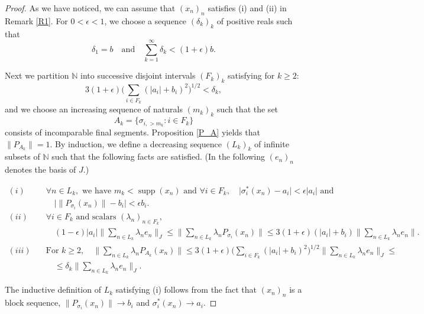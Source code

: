 \documentclass[10pt,a4paper]{amsart}
\DeclareMathOperator{\supp}{supp}
\newcommand{\N}{\mathbb{N}}
\newcommand{\s}{\sigma}
\begin{document}
\begin{proof}
As we have noticed, we can assume that $(x_n)_n$ satisfies (i) and (ii) in Remark \ref{R1}. For $0< \epsilon < 1$, we choose a sequence $(\delta_k)_k$ of positive reals such that
\begin{equation}\label{eqn:eq.13}
\delta_1 = b \quad \text{and} \quad \sum_{k=1}^\infty \delta_k < (1 +\epsilon) b.
\end{equation}

Next we partition $\N$ into successive disjoint intervals $(F_k)_k$ satisfying for $k\geq 2$:
\begin{equation}\label{eqn:eq.12}
3(1+\epsilon) \Big(\sum_{i\in F_k}(|a_i| + b_i)^2 \Big)^{1/2} < \delta_k,
\end{equation}
and we choose an increasing sequence of naturals $(m_k)_k$ such that the set
\[ A_k =\Big\{ \s_{i,> m_k} : i \in F_k\Big\} \]
consists of incomparable final segments. Proposition \ref{P_A} yields that $\|P_{A_k}\| = 1$.
By induction, we define a decreasing sequence $(L_k)_k$ of infinite subsets of $\N$ such that the following facts are satisfied. (In the following $(e_n)_n$ denotes the basis of $J$.)

\begin{equation}\label{eqn:eq.11}
\begin{split}
(i) \quad &\forall n\in L_k, \text{ we have } m_k < \supp(x_n) \text{ and } \forall i\in F_k, \quad \Big| \s_i^*(x_n) -a_i \Big| < \epsilon |a_i| \text{ and }  \\
&\quad \Big| \|P_{\s_i}(x_n)\| - b_i \Big| < \epsilon b_i. \\
(ii) \quad &\forall i\in F_k \text{ and scalars }(\lambda_n)_{n\in F_k},\\
&\quad (1-\epsilon) |a_i| \Big\| \sum_{n\in L_k}\lambda_ne_n \Big\|_J\leq \Big\| \sum_{n\in L_k} \lambda_nP_{\s_i}(x_n) \Big\|  \leq  3(1+\epsilon)(|a_i|+ b_i)\Big\| \sum_{n \in L_k} \lambda_ne_n \Big\|. \\
(iii) \quad &\text{For } k\geq 2, \quad \Big\| \sum_{n\in L_k} \lambda_nP_{A_k}(x_n) \Big\| \leq 3(1+\epsilon)\Big(\sum_{i\in F_k}(|a_i|+ b_i)^2\Big)^{1/2}\Big\| \sum_{n \in L_k} \lambda_ne_n \Big\| _J\leq \\ &\quad \leq  \delta_k \Big\| \sum_{n \in L_k} \lambda_ne_n \Big\|_J.
\end{split}
\end{equation}

The inductive definition of $L_k$ satisfying (i) follows from the fact that $(x_n)_n$ is a block sequence, $\|P_{\s_i}(x_n)\| \to b_i$ and $\s_i^*(x_n) \to a_i$.


\end{proof}
\end{document}

